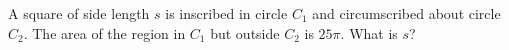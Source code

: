 A square of side length $s$ is inscribed in circle $C_1$ and circumscribed about circle $C_2$. The area of the region in $C_1$ but outside $C_2$ is $25\pi$. What is $s$?